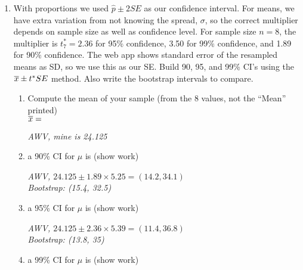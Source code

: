 \begin{enumerate}
\begin{enumerate}
\begin{students}
        \vspace{2cm}        
\end{students}
\begin{key}
 {\it The sample.  This is just like the simulation we did for
    proportions, but the method for computing the confidence interval
    is different.}
\end{key}
\end{enumerate}
\item With proportions we used $\widehat{p} \pm 2 SE$ as our
  confidence interval.  For means, we have extra variation from not
  knowing the spread, $\sigma$, so the correct multiplier depends on
  sample size as well as confidence level.  For sample size $n=8$, the
  multiplier is $t_7^* = 2.36$ for 95\% confidence, 3.50 for 99\%
  confidence, and 1.89 for 90\% confidence.  The web app shows
  standard error of the resampled means as SD, so we use this as our
  SE.  Build 90, 95, and 99\% CI's using the $\overline{x} \pm t^* SE$ method.
  Also write the bootstrap intervals to compare.\\
  \begin{enumerate}
  \item Compute the mean of your sample (from the 8 values, not the
    ``Mean'' printed) \\ $\overline{x} =$ 
\begin{key}
 {\it AWV, mine is 24.125}
\end{key}
\item a 90\% CI for $\mu$ is (show work)
\begin{students}
        \vspace{1cm}        
\end{students}
\begin{key}
 {\it AWV, $24.125 \pm  1.89 \times 5.25 = (14.2, 34.1)$\\
     Bootstrap: (15.4, 32.5)}
\end{key}
\item a 95\% CI for $\mu$ is (show work)
\begin{students}
        \vspace{1cm}        
\end{students}
\begin{key}
 {\it AWV, $24.125 \pm  2.36 \times 5.39 = (11.4, 36.8)$\\
     Bootstrap: (13.8, 35)}
\end{key}
\item a 99\% CI for $\mu$ is (show work)
\begin{students}

\end{students}
\end{enumerate}
\end{enumerate}
